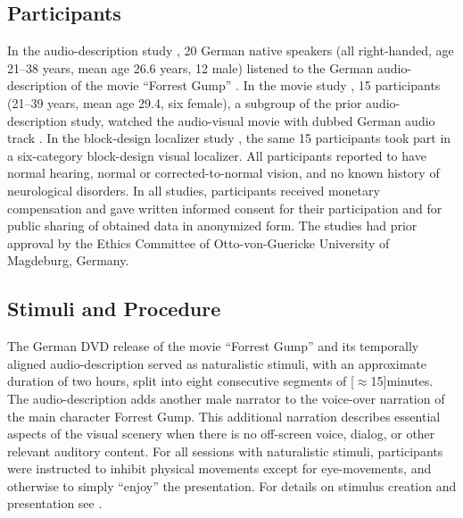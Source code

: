 \documentclass[english]{article}
\begin{document}
\subsection{Participants}
In the audio-description study \citep{hanke2014audiomovie}, 20 German native
speakers (all right-handed, age 21–38 years, mean age 26.6 years, 12 male)
listened to the German audio-description \citep{ForrestGumpGermanAD} of the
movie ``Forrest Gump'' \citep{ForrestGumpMovie}.
In the movie study \citep{hanke2016simultaneous}, 15 participants (21–39 years,
mean age 29.4, six female), a subgroup of the prior audio-description study,
watched the audio-visual movie with dubbed German audio track
\citep{ForrestGumpDVD}.
In the block-design localizer study \citep{sengupta2016extension}, the same 15
participants took part in a six-category block-design visual localizer.
All participants reported to have normal hearing, normal or corrected-to-normal
vision, and no known history of neurological disorders.
In all studies, participants received monetary compensation and gave written
informed consent for their participation and for public sharing of obtained data
in anonymized form. The studies had prior approval by the Ethics Committee of
Otto-von-Guericke University of Magdeburg, Germany.


\subsection{Stimuli and Procedure}

The German DVD release \citep{ForrestGumpDVD} of the movie ``Forrest Gump''
\citep{ForrestGumpMovie} and its temporally aligned audio-description
\citep{ForrestGumpGermanAD} served as naturalistic stimuli, with an approximate
duration of two hours, split into eight consecutive segments of
\unit[$\approx$15]{minutes}.
The audio-description adds another male narrator to the voice-over narration of
the main character Forrest Gump. This additional narration describes essential
aspects of the visual scenery when there is no off-screen voice, dialog, or
other relevant auditory content.
For all sessions with naturalistic stimuli, participants were instructed to
inhibit physical movements except for eye-movements, and otherwise to simply
``enjoy'' the presentation.
%
For details on stimulus creation and presentation see
\cite{hanke2014audiomovie,hanke2016simultaneous}.
\end{document}
